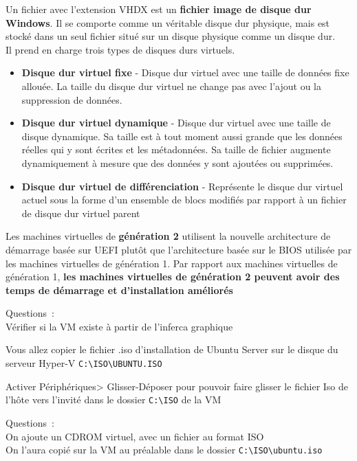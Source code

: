 \noindent Un fichier avec l'extension VHDX est un \textbf{fichier image de disque dur Windows}. Il se comporte comme un véritable disque dur physique, mais est stocké dans un seul fichier situé sur un disque physique comme un disque dur. \\
Il prend en charge trois types de disques durs virtuels. \\
\begin{itemize}
  \item \textbf{Disque dur virtuel fixe} - Disque dur virtuel avec une taille de données fixe allouée. La taille du disque dur virtuel ne change pas avec l’ajout ou la suppression de données.
  \item \textbf{Disque dur virtuel dynamique} - Disque dur virtuel avec une taille de disque dynamique. Sa taille est à tout moment aussi grande que les données réelles qui y sont écrites et les métadonnées. Sa taille de fichier augmente dynamiquement à mesure que des données y sont ajoutées ou supprimées.
  \item \textbf{Disque dur virtuel de différenciation} - Représente le disque dur virtuel actuel sous la forme d’un ensemble de blocs modifiés par rapport à un fichier de disque dur virtuel parent
\end{itemize}

\noindent Les machines virtuelles de \textbf{génération 2} utilisent la nouvelle architecture de démarrage basée sur UEFI plutôt que l'architecture basée sur le BIOS utilisée par les machines virtuelles de génération 1. Par rapport aux machines virtuelles de génération 1, \textbf{les machines virtuelles de génération 2 peuvent avoir des temps de démarrage et d'installation améliorés}

\vspace{0.5cm}

Questions~: \\
Vérifier si la VM existe à partir de l'inferca graphique

\noindent Vous allez copier le fichier .iso d'installation de Ubuntu Server sur le disque du serveur Hyper-V \verb|C:\ISO\UBUNTU.ISO|

\noindent Activer Périphériques> Glisser-Déposer pour pouvoir faire glisser le fichier Iso de l'hôte vers l'invité dans le dossier \verb|C:\ISO| de la VM

\newpage

Questions~: \\
On ajoute un CDROM virtuel, avec un fichier au format ISO \\
On l’aura copié sur la VM au préalable dans le dossier \verb|C:\ISO\ubuntu.iso|


